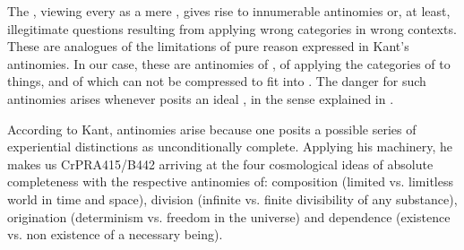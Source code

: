 \pa The , viewing every  as a
mere , gives rise to innumerable antinomies or, at least,
illegitimate questions resulting from applying wrong categories in wrong
contexts. These are analogues of the limitations of pure reason expressed in
Kant's antinomies. 
In our case, these are {antinomies of }, of applying the
categories of  to things,  and
 of  which can not be compressed to fit into \hoa.
The danger for such antinomies arises whenever  posits an
ideal , in the sense explained in .

According to Kant, antinomies arise because one posits a possible series of
experiential distinctions as unconditionally complete. Applying his machinery,
he makes us \citet{select out those categories which necessarily lead to a
  series in the synthesis of the manifold,}{CrPR}{A415/B442} arriving at the
four cosmological ideas of absolute completeness with the respective antinomies
of: composition (limited vs.  limitless world in time and space), division
(infinite vs. finite divisibility of any substance), origination (determinism
vs. freedom in the universe) and dependence (existence vs. non existence of a
necessary being).

